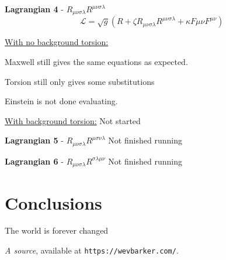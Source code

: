 \documentclass[letterpaper,12pt]{article}
\begin{document}
\textbf{Lagrangian 4} - $ R_{\mu \nu \sigma \lambda} R^{\mu \nu \sigma \lambda}$
\begin{equation}
\mathcal{L}=\sqrt{g}(R+\zeta R_{\mu \nu \sigma \lambda} R^{\mu \nu \sigma \lambda}+\kappa F{\mu \nu}F^{\mu \nu})
\end{equation}

\underline{With no background torsion:}

Maxwell still gives the same equations as expected.

Torsion still only gives some substitutions

Einstein is not done evaluating.



\underline{With background torsion:}
Not started

\textbf{Lagrangian 5} - $ R_{\mu \nu \sigma \lambda} R^{\mu \sigma \nu \lambda}$
Not finished running

\textbf{Lagrangian 6} - $ R_{\mu \nu \sigma \lambda} R^{\sigma \lambda \mu \nu }$
Not finished running

\section{Conclusions}
The world is forever changed


\begin{thebibliography}{99}

 \emph{A source},  available at
\texttt{https://wevbarker.com/}.

\end{thebibliography}
\end{document}
